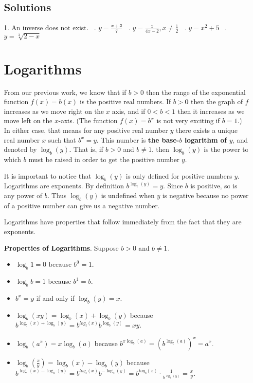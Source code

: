 \documentclass[11pt]{book}               %
\begin{document}
\subsection{Solutions} 
1. An inverse does not exist.  \ . $y=\frac{x+3}{7}$  \ . $ y=\frac{x}{4x-2}, x \neq \frac{1}{2}$  \ . $y=x^2+5$  \ .$y=\sqrt[3]{2-x}$

\newpage
\label{section_logarithms}
\section{Logarithms}

From our previous work, we know that if $b > 0$ then the range of the exponential function $f(x) = b(x)$
is the positive real numbers.
If $b > 0$ then the graph of $f$ increases as we move right on the $x$ axis, and if $0 < b < 1$ then it increases as we move left on the $x$-axis.
(The function $f(x) = b^x$ is not very exciting if $b = 1$.)
In either case, that means for any positive real number $y$ there exists a unique real number $x$ such that $b^x = y$.
This number is \textbf{the base-$b$ logarithm of $y$}, and denoted by $\log_b(y)$.
That is, if $b > 0$ and $b \neq 1$, then $\log_b(y)$ is the power to which $b$ must be raised in
order to get the positive number $y$.

It is important to notice that $\log_b(y)$ is only defined for positive numbers $y$.
Logarithms are exponents.
By definition $b^{\log_b(y)} = y$.
Since $b$ is positive, so is any power of $b$.
Thus $\log_b(y)$ is undefined when $y$ is negative because no power of a 
positive number can give us a negative number.

Logarithms have properties that follow immediately from the fact that they are exponents.

\noindent
\textbf{Properties of Logarithms}.  Suppose $b > 0$ and $b \neq 1$.
\begin{itemize}
\item $ \log_b{1} = 0 $ because $b^0 = 1$.
\item $ \log_b{b} = 1 $ because $b^1 = b$.
\item $ b^x = y$ if and only if $\log_b(y) = x$.

\medskip
\item $\log_b(xy) = \log_b(x) + \log_b(y)$ because $b^{\log_b(x) + \log_b(y)} = b^{log_b(x)}  b^{\log_b(y)} = xy$.
\item $\log_b(a^x) = x \log_b(a)$ because $b^{x \log_b(a)} = \left(b^{\log_b(a)}\right)^x = a^x$.
\item $\log_b\left(\frac{x}{y}\right) =  \log_b(x) - \log_b(y)$ because 
$b^{ \log_b(x) - \log_b(y)} = b^{log_b(x)}  b^{-\log_b(y)} = 
 b^{log_b(x)}  \cdot \frac{1}{b^{\log_b(y)}} = 
\frac{x}{y}$.

\end{itemize}
\end{document}
